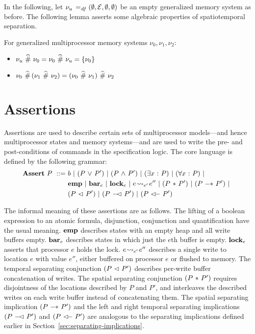 \documentclass[11pt]{report}
\begin{document}
In the following, let $\nu_u \operatorname{\;=_{\mathit{df}}\;} (\operatorname{\emptyset}, \mathcal{E}, \operatorname{\emptyset}, \operatorname{\emptyset})$ be an empty generalized memory system as before. The following lemma asserts some algebraic properties of spatiotemporal separation. \begin{lemma}
  \label{lem:spatiotemporal-separation-algebra}
  For generalized multiprocessor memory systems $\nu_0, \nu_1, \nu_2$: 
  \begin{itemize}
    \item $\nu_u \operatorname{\,\widehat{\#}\,} \nu_0 = \nu_0 \operatorname{\,\widehat{\#}\,} \nu_u = \left\lbrace \nu_0 \right\rbrace$
    \item $\nu_0 \operatorname{\,\widehat{\#}\,} (\nu_1 \operatorname{\,\widehat{\#}\,} \nu_2) = (\nu_0 \operatorname{\,\widehat{\#}\,} \nu_1) \operatorname{\,\widehat{\#}\,} \nu_2$
  \end{itemize}
\end{lemma}

\section{Assertions}
\label{sec:assertions}
\label{sec:multiprocessor-assertions}

Assertions are used to describe certain sets of multiprocessor models---and hence multiprocessor states and memory systems---and are used to write the pre- and post-conditions of commands in the specification logic. The core language is defined by the following grammar: \begin{align*}
	\asserts~P \bnfdef & b \bnfbar (P \disj P') \bnfbar (P \conj P') \bnfbar (\exists x \st P) \bnfbar (\forall x \st P) \bnfbar \\
	& \femp \bnfbar \fbar{e} \bnfbar \flock{e} \bnfbar e \fwrite{e'} e'' \bnfbar (P \fsep P') \bnfbar (P \fsepi P')  \bnfbar \\ 
	&  (P \fseq P') \bnfbar (P \fseqli P') \bnfbar (P \fseqri P')
\end{align*} 

The informal meaning of these assertions are as follows. The lifting of a boolean expression to an atomic formula, disjunction, conjunction and quantification have the usual meaning. $\mathbf{emp}$ describes states with an empty heap and all write buffers empty. $\mathbf{bar}_{e}$ describes states in which just the $e$th buffer is empty. $\mathbf{lock}_{e}$ asserts that processor $e$ holds the lock. $e \!\leadsto_{e'}\! e''$ describes a single write to location $e$ with value $e''$, either buffered on processor $e$ or flushed to memory. The temporal separating conjunction $(P \operatorname{\,\vartriangleleft\,} P')$ describes per-write buffer concatenation of writes. The spatial separating conjunction $(P \operatorname{\,\ast\,} P')$ requires disjointness of the locations described by $P$ and $P'$, and interleaves the described writes on each write buffer instead of concatenating them. The spatial separating implication $(P \fsepi P')$ and the left and right temporal separating implications $(P \fseqli P')$ and $(P \fseqri P')$ are analogous to the separating implications defined earlier in Section~\ref{sec:separating-implications}. 
\end{document}
